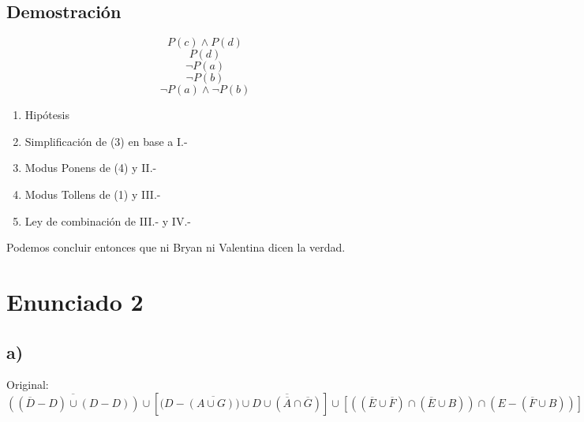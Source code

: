 \documentclass[letterpaper,10pt]{article}
\begin{document}
\subsection{Demostraci\'on}
\begin{minipage}[c]{0.4\textwidth}
\begin{equation*}
    P(c) \wedge  P(d)
\end{equation*}
\begin{equation*}
    P(d)
\end{equation*}
\begin{equation*}
    \neg P(a)
\end{equation*}
\begin{equation*}
    \neg P(b)
\end{equation*}
\begin{equation*}
    \neg P(a) \wedge \neg P(b)
\end{equation*}
\end{minipage}
\begin{minipage}[c]{0.5\textwidth}
\begin{enumerate}[I{.-}]
    \item Hip\'otesis
    \item Simplificaci\'on de (3) en base a I.-
    \item Modus Ponens de (4) y II.-
    \item Modus Tollens de (1) y III.-
    \item Ley de combinaci\'on de III.- y IV.-
\end{enumerate}
\end{minipage}
\vspace{0.3cm}
\newline
Podemos concluir entonces que ni Bryan ni Valentina dicen la verdad.


\section{Enunciado 2}

\subsection*{a)}
Original:
\begin{equation*}
    \overline{((\overline{D}-D)\cup(D-D))}\cup [(D-\overline{(A \cup G))} \cup \overline{D\cup(\overline{A}\cap \overline{G})}] \cup [((\overline{E}\cup \overline{F})\cap (\overline{E}\cup B)) \cap (E - (\overline{F}\cup B))]
\end{equation*}
\end{document}
